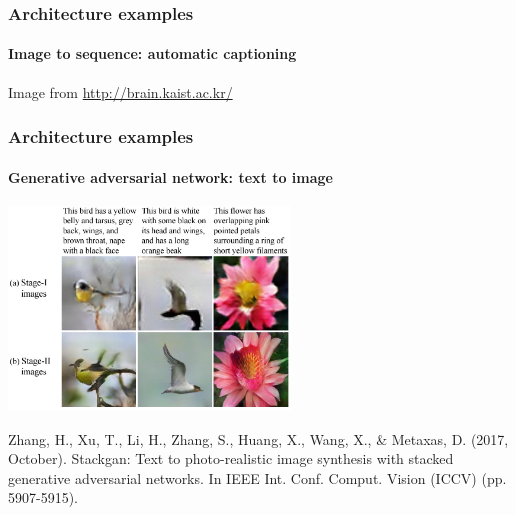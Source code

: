 \documentclass[9pt]{beamer}
\begin{document}



\begin{frame}
  \frametitle{Architecture examples}

  \framesubtitle{Image to sequence: automatic captioning}

  \begin{center}
  \end{center}

  {\small Image from \url{http://brain.kaist.ac.kr/}}
\end{frame}

\begin{frame}
  \frametitle{Architecture examples}

  \framesubtitle{Generative adversarial network: text to image}

  \begin{center}
    \includegraphics[width=7.5cm]{images/GAN_2.jpg}
  \end{center}

  {\footnotesize Zhang, H., Xu, T., Li, H., Zhang, S., Huang, X.,
    Wang, X., \& Metaxas, D. (2017, October). Stackgan: Text to
    photo-realistic image synthesis with stacked generative
    adversarial networks. In IEEE Int. Conf. Comput. Vision (ICCV)
    (pp. 5907-5915).}
\end{frame}
\end{document}
